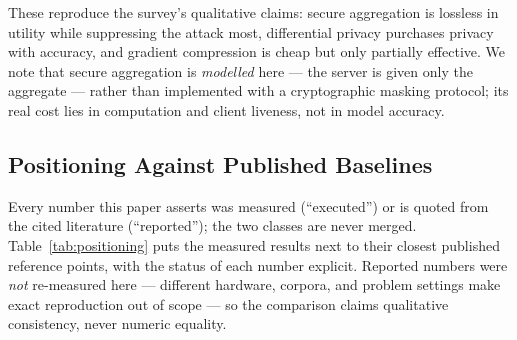 \documentclass[11pt,a4paper]{article}
\theoremstyle{plain}
\theoremstyle{definition}
\begin{document}
These reproduce the survey's qualitative claims: secure aggregation is
lossless in utility while suppressing the attack most, differential privacy
purchases privacy with accuracy, and gradient compression is cheap but only
partially effective. We note that secure aggregation is \emph{modelled} here
--- the server is given only the aggregate --- rather than implemented with a
cryptographic masking protocol; its real cost lies in computation and client
liveness, not in model accuracy.

\subsection{Positioning Against Published Baselines}
\label{sec:positioning}

Every number this paper asserts was measured (``executed'') or is quoted
from the cited literature (``reported''); the two classes are never merged.
Table~\ref{tab:positioning} puts the measured results next to their closest
published reference points, with the status of each number explicit.
Reported numbers were \emph{not} re-measured here --- different hardware,
corpora, and problem settings make exact reproduction out of scope --- so
the comparison claims qualitative consistency, never numeric equality.
\end{document}
